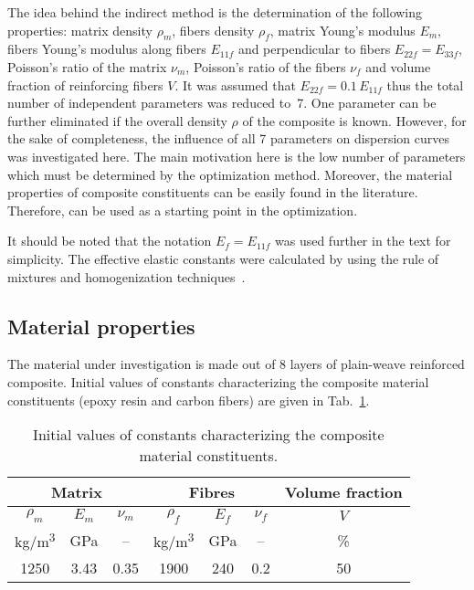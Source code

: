 \documentclass[]{spie}  %
\begin{document}
The idea behind the indirect method is the determination of the following properties: matrix density  \(\rho_m\), fibers density \(\rho_f\), matrix Young's modulus \(E_m\), fibers Young's modulus along fibers \(E_{11f}\) and perpendicular to fibers \(E_{22f}=E_{33f}\), Poisson's ratio of the matrix \(\nu_m\), Poisson's ratio of the fibers \(\nu_f\) and volume fraction of reinforcing fibers \(V\). 
It was assumed that \(E_{22f} = 0.1\, E_{11f}\) thus the total number of independent parameters was reduced to~7. 
One parameter can be further eliminated if the overall density \(\rho\) of the composite is known. 
However, for the sake of completeness, the influence of all 7 parameters on dispersion curves was investigated here. 
The main motivation here is the low number of parameters which must be determined by the optimization method. 
Moreover, the material properties of composite constituents can be easily found in the literature. 
Therefore, can be used as a starting point in the optimization. 

It should be noted that the notation \(E_f = E_{11f}\) was used further in the text for simplicity. 
The effective elastic constants were calculated by using the rule of mixtures and homogenization techniques~\cite{Barbero2006a,Adumitroaie2012}.

\subsection{Material properties}
The material under investigation is made out of 8 layers of plain-weave reinforced composite. 
Initial values of constants characterizing the composite material constituents (epoxy resin and carbon fibers) are given in Tab.~\ref{tab:matprop}.

\begin{table}[ht]
		\renewcommand{\arraystretch}{1.3}
		\caption{Initial values of constants characterizing the composite material 
			constituents.}
		
		\label{tab:matprop}
		\begin{center}	
			\begin{tabular}{ccccccc} 
				\toprule
				\multicolumn{3}{c}{\textbf{Matrix} }	& \multicolumn{3}{c}{\textbf{Fibres} } & 
				\textbf{Volume fraction}	 \\ 
				\midrule
				\(\rho_m\) & \(E_m\) & \(\nu_m\)  & \(\rho_f\) & \(E_f\) & \(\nu_f\) & \(V\)\\
				kg/m\textsuperscript{3} &GPa& --  & kg/m\textsuperscript{3}  & GPa& -- & \%\\ 
				\cmidrule(lr){1-3} \cmidrule(lr){4-6} \cmidrule(lr){7-7}
				1250 &3.43& 0.35& 1900 & 240 & 0.2 & 50\\
				\bottomrule 
			\end{tabular} 
		\end{center}
\end{table}
\end{document}
